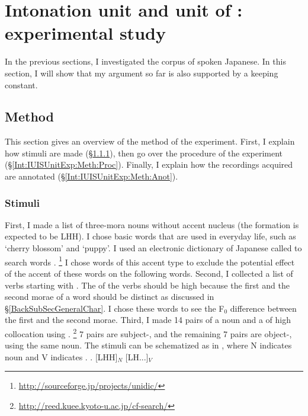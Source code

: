 \section[IU and IS unit: experimental study]{Intonation unit and unit of : experimental study}\label{Int:IUISUnitExp}

In the previous sections,
I investigated the corpus of spoken Japanese.
In this section,
I will show that my argument so far is also supported by a  keeping  constant.


\subsection{Method}\label{Int:IUISUnitExp:Meth}

This section gives an overview of the method of the experiment.
First, I explain how stimuli are made (\S \ref{Int:IUISUnitExp:Meth:Sti}),
then go over the procedure of the experiment (\S \ref{Int:IUISUnitExp:Meth:Proc}).
Finally,
I explain how the recordings acquired are annotated (\S \ref{Int:IUISUnitExp:Meth:Anot}).

\subsubsection{Stimuli}\label{Int:IUISUnitExp:Meth:Sti}

First, I made a list of three-mora nouns without accent nucleus (the  formation is expected to be LHH).
I chose basic words that are used in everyday life,
such as  `cherry blossom' and  `puppy'.
I used an electronic dictionary of Japanese called 
to search words
\cite{denetal02,denetal07}.%
	\footnote{\url{http://sourceforge.jp/projects/unidic/}}
I chose words of this accent type to
exclude the potential effect of the accent of these words on the following words.
Second, I collected a list of verbs starting with .
The  of the verbs should be high because the first and the second morae of a word should be distinct as discussed in \S \ref{BackSubSecGeneralChar}.
I chose these words to see the F$_{0}$ difference between the first
and the second morae.
Third, I made 14 pairs of a noun and a  of high collocation using  \cite{kawaharakurohashi06b,kawaharakurohashi06}.%
	\footnote{\url{http://reed.kuee.kyoto-u.ac.jp/cf-search/}}
7 pairs are subject-, and
the remaining 7 pairs are object-,
using the same noun.
The stimuli can be schematized as in \Next,
where N indicates noun and V indicates .
%
\ex. [LHH]$_{N}$ [LH...]$_{V}$

